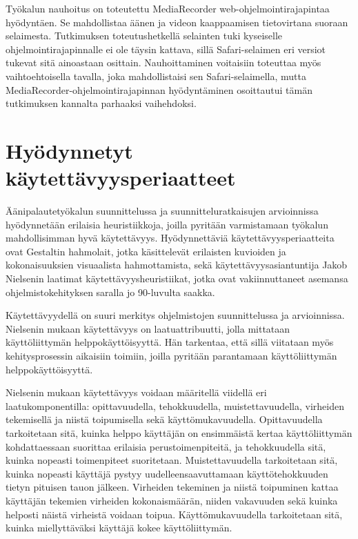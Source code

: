 \documentclass[utf8]{gradu3}
\begin{document}
Työkalun nauhoitus on toteutettu MediaRecorder web-ohjelmointirajapintaa hyödyntäen. Se mahdollistaa äänen ja videon kaappaamisen tietovirtana suoraan selaimesta. Tutkimuksen toteutushetkellä selainten tuki kyseiselle ohjelmointirajapinnalle ei ole täysin kattava, sillä Safari-selaimen eri versiot tukevat sitä ainoastaan osittain. Nauhoittaminen voitaisiin toteuttaa myös vaihtoehtoisella tavalla, joka mahdollistaisi sen Safari-selaimella, mutta MediaRecorder-ohjelmointirajapinnan hyödyntäminen osoittautui tämän tutkimuksen kannalta parhaaksi vaihehdoksi.

\section{Hyödynnetyt käytettävyysperiaatteet}
\label{Kaytettavyysperiaatteet}

Äänipalautetyökalun suunnittelussa ja suunnitteluratkaisujen arvioinnissa hyödynnetään erilaisia heuristiikkoja, joilla pyritään varmistamaan työkalun mahdollisimman hyvä käytettävyys. Hyödynnettäviä käytettävyysperiaatteita ovat Gestaltin hahmolait, jotka käsittelevät erilaisten kuvioiden ja kokonaisuuksien visuaalista hahmottamista, sekä käytettävyysasiantuntija Jakob Nielsenin laatimat käytettävyysheuristiikat, jotka ovat vakiinnuttaneet asemansa ohjelmistokehityksen saralla jo 90-luvulta saakka.

Käytettävyydellä on suuri merkitys ohjelmistojen suunnittelussa ja arvioinnissa. Nielsenin mukaan \parencite*{intro-usability} käytettävyys on laatuattribuutti, jolla mittataan käyttöliittymän helppokäyttöisyyttä. Hän tarkentaa, että sillä viitataan myös kehitysprosessin aikaisiin toimiin, joilla pyritään parantamaan käyttöliittymän helppokäyttöisyyttä.

Nielsenin \parencite*{intro-usability} mukaan käytettävyys voidaan määritellä viidellä eri laatukomponentilla: opittavuudella, tehokkuudella, muistettavuudella, virheiden tekemisellä ja niistä toipumisella sekä käyttömukavuudella. Opittavuudella tarkoitetaan sitä, kuinka helppo käyttäjän on ensimmäistä kertaa käyttöliittymän kohdattaessaan suorittaa erilaisia perustoimenpiteitä, ja tehokkuudella sitä, kuinka nopeasti toimenpiteet suoritetaan. Muistettavuudella tarkoitetaan sitä, kuinka nopeasti käyttäjä pystyy uudelleensaavuttamaan käyttötehokkuuden tietyn pituisen tauon jälkeen. Virheiden tekeminen ja niistä toipuminen kattaa käyttäjän tekemien virheiden kokonaismäärän, niiden vakavuuden sekä kuinka helposti näistä virheistä voidaan toipua. Käyttömukavuudella tarkoitetaan sitä, kuinka miellyttäväksi käyttäjä kokee käyttöliittymän.
\end{document}
